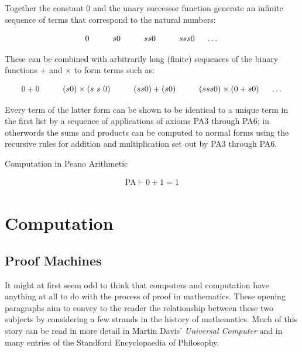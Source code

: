 \documentclass{book}
\begin{document}
    

    Together the constant 0 and the unary successor function generate an infinite sequence of terms that correspond to the natural numbers: 

    $$0 \hspace{1cm} s 0 \hspace{1cm} s s 0 \hspace{1cm} s s s 0 \hspace{0.5cm} \dots$$

    These can be combined with arbitrarily long (finite) sequences of the binary functions $+$ and $\times$ to form terms such as: 

    $$0 + 0 \hspace{1cm} (s 0) \times (s \ s \ 0) \hspace{1cm} (s s 0) + (s 0) \hspace{1cm} (s s s 0) \times (0 + s 0) \hspace{0.5cm} \dots $$

    Every term of the latter form can be shown to be identical to a unique term in the first list by a sequence of applications of axioms PA3 through PA6; in otherwords the sums and products can be computed to normal forms using the recursive rules for addition and multiplication set out by PA3 through PA6. 

    \begin{eg}{Computation in Peano Arithmetic}

        $$ \text{PA} \vdash 0 + 1 = 1$$

    \end{eg}




\chapter{Computation}

    \newpage
    \section{Proof Machines}

    It might at first seem odd to think that computers and computation have anything at all to do with the process of proof in mathematics. These opening paragraphs aim to convey to the reader the relationship between these two subjects by considering a few strands in the history of mathematics. Much of this story can be read in more detail in Martin Davis' \emph{Universal Computer} and in many entries of the Standford Encyclopaedia of Philosophy.
\end{document}
